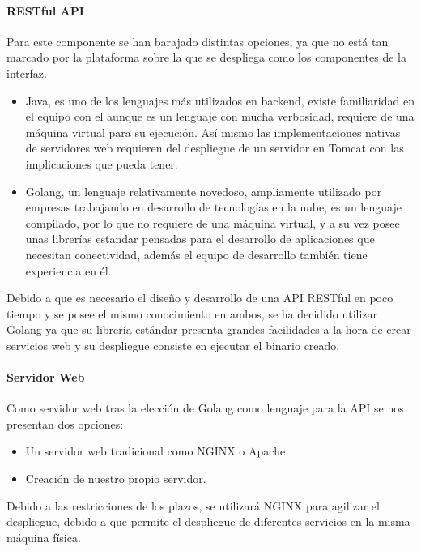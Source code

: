 \documentclass{article}
\begin{document}
\paragraph*{RESTful API}

Para este componente se han barajado distintas opciones, ya que no está tan marcado por la plataforma sobre la que se despliega como los componentes de la interfaz.
\begin{itemize}
    \item Java, es uno de los lenguajes más utilizados en backend, existe familiaridad en el equipo con el aunque es un lenguaje con mucha verbosidad, requiere
        de una máquina virtual para su ejecución. Así mismo las implementaciones nativas de servidores web requieren del despliegue de un servidor en Tomcat con
        las implicaciones que pueda tener.
    \item Golang, un lenguaje relativamente novedoso, ampliamente utilizado por empresas trabajando en desarrollo de tecnologías en la nube, es un lenguaje 
        compilado, por lo que no requiere de una máquina virtual, y a su vez posee unas librerías estandar pensadas para el desarrollo de aplicaciones que 
        necesitan conectividad, además el equipo de desarrollo también tiene experiencia en él.
\end{itemize}

Debido a que es necesario el diseño y desarrollo de una API RESTful en poco tiempo y se posee el mismo conocimiento en ambos, se ha decidido utilizar Golang ya que su librería estándar presenta grandes facilidades a la hora de crear servicios web y su despliegue consiste en ejecutar el binario creado.

\paragraph*{Servidor Web}

Como servidor web tras la elección de Golang como lenguaje para la API se nos presentan dos opciones:

\begin{itemize}
    \item Un servidor web tradicional como NGINX o Apache.
    \item Creación de nuestro propio servidor.
\end{itemize}

Debido a las restricciones de los plazos, se utilizará NGINX para agilizar el despliegue, debido a que permite el despliegue de diferentes servicios en la misma
máquina física.
\end{document}
